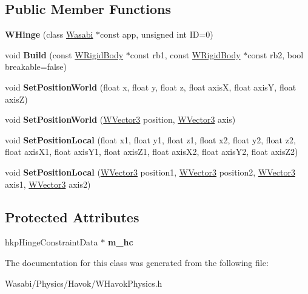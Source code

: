 \subsection*{Public Member Functions}
\begin{DoxyCompactItemize}
\item 
{\bfseries W\+Hinge} (class \hyperlink{class_wasabi}{Wasabi} $\ast$const app, unsigned int ID=0)\hypertarget{class_w_hinge_a28f8878ba2388905b9b604d4867874b8}{}\label{class_w_hinge_a28f8878ba2388905b9b604d4867874b8}

\item 
void {\bfseries Build} (const \hyperlink{class_w_rigid_body}{W\+Rigid\+Body} $\ast$const rb1, const \hyperlink{class_w_rigid_body}{W\+Rigid\+Body} $\ast$const rb2, bool breakable=false)\hypertarget{class_w_hinge_ab85cc6e92b8174a2eb80bf394c082729}{}\label{class_w_hinge_ab85cc6e92b8174a2eb80bf394c082729}

\item 
void {\bfseries Set\+Position\+World} (float x, float y, float z, float axisX, float axisY, float axisZ)\hypertarget{class_w_hinge_a81d88100d479f10735ab64db03b714e4}{}\label{class_w_hinge_a81d88100d479f10735ab64db03b714e4}

\item 
void {\bfseries Set\+Position\+World} (\hyperlink{class_w_vector3}{W\+Vector3} position, \hyperlink{class_w_vector3}{W\+Vector3} axis)\hypertarget{class_w_hinge_ad7a8a192cc3f12ef187aa10d98fe7e4e}{}\label{class_w_hinge_ad7a8a192cc3f12ef187aa10d98fe7e4e}

\item 
void {\bfseries Set\+Position\+Local} (float x1, float y1, float z1, float x2, float y2, float z2, float axis\+X1, float axis\+Y1, float axis\+Z1, float axis\+X2, float axis\+Y2, float axis\+Z2)\hypertarget{class_w_hinge_a731cdbec306cf7212be788f5c0c08126}{}\label{class_w_hinge_a731cdbec306cf7212be788f5c0c08126}

\item 
void {\bfseries Set\+Position\+Local} (\hyperlink{class_w_vector3}{W\+Vector3} position1, \hyperlink{class_w_vector3}{W\+Vector3} position2, \hyperlink{class_w_vector3}{W\+Vector3} axis1, \hyperlink{class_w_vector3}{W\+Vector3} axis2)\hypertarget{class_w_hinge_a46fc4432691687aaa1a1b48eda5fcb51}{}\label{class_w_hinge_a46fc4432691687aaa1a1b48eda5fcb51}

\end{DoxyCompactItemize}
\subsection*{Protected Attributes}
\begin{DoxyCompactItemize}
\item 
hkp\+Hinge\+Constraint\+Data $\ast$ {\bfseries m\+\_\+hc}\hypertarget{class_w_hinge_a5e111580f3374572b301c0eeefa769ef}{}\label{class_w_hinge_a5e111580f3374572b301c0eeefa769ef}

\end{DoxyCompactItemize}


The documentation for this class was generated from the following file\+:\begin{DoxyCompactItemize}
\item 
Wasabi/\+Physics/\+Havok/W\+Havok\+Physics.\+h\end{DoxyCompactItemize}
